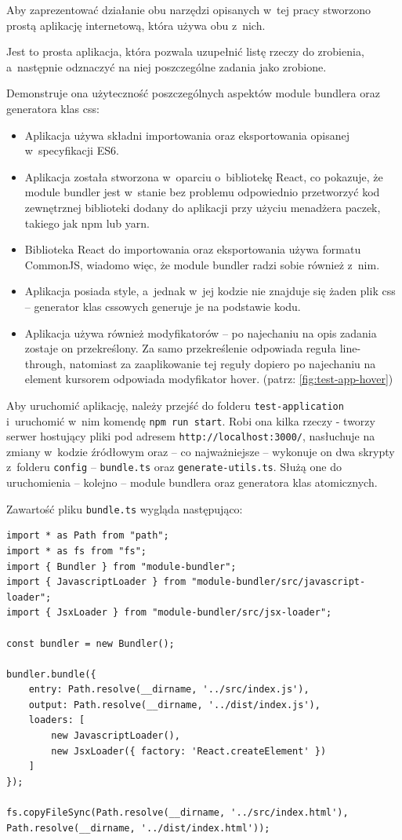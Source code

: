 \documentclass{SGGW-thesis}
\begin{document}
Aby zaprezentować działanie obu narzędzi opisanych w~tej pracy stworzono prostą aplikację internetową, która używa obu z~nich.

Jest to prosta aplikacja, która pozwala uzupełnić listę rzeczy do zrobienia, a~następnie odznaczyć na niej poszczególne zadania jako zrobione.

Demonstruje ona użyteczność poszczególnych aspektów module bundlera oraz generatora klas css:
\begin{itemize}
    \item Aplikacja używa składni importowania oraz eksportowania opisanej w~specyfikacji ES6.
    \item Aplikacja została stworzona w~oparciu o~bibliotekę React, co pokazuje, że module bundler jest w~stanie bez problemu odpowiednio przetworzyć kod zewnętrznej biblioteki dodany do aplikacji przy użyciu menadżera paczek, takiego jak npm lub yarn.
    \item Biblioteka React do importowania oraz eksportowania używa formatu CommonJS, wiadomo więc, że module bundler radzi sobie również z~nim.
    \item Aplikacja posiada style, a~jednak w~jej kodzie nie znajduje się żaden plik css -- generator klas cssowych generuje je na podstawie kodu.
    \item Aplikacja używa również modyfikatorów -- po najechaniu na opis zadania zostaje on przekreślony. Za samo przekreślenie odpowiada reguła line-through, natomiast za zaaplikowanie tej reguły dopiero po najechaniu na element kursorem odpowiada modyfikator hover. (patrz: \ref{fig:test-app-hover})
\end{itemize}

Aby uruchomić aplikację, należy przejść do folderu \verb|test-application| i~uruchomić w~nim komendę \verb|npm run start|. Robi ona kilka rzeczy - tworzy serwer hostujący pliki pod adresem \verb|http://localhost:3000/|, nasłuchuje na zmiany w~kodzie źródłowym oraz -- co najważniejsze -- wykonuje on dwa skrypty z~folderu \verb|config| -- \verb|bundle.ts| oraz \verb|generate-utils.ts|. Służą one do uruchomienia -- kolejno -- module bundlera oraz generatora klas atomicznych.

Zawartość pliku \verb|bundle.ts| wygląda następująco:

\begin{verbatim}
import * as Path from "path";
import * as fs from "fs";
import { Bundler } from "module-bundler";
import { JavascriptLoader } from "module-bundler/src/javascript-loader";
import { JsxLoader } from "module-bundler/src/jsx-loader";

const bundler = new Bundler();

bundler.bundle({
	entry: Path.resolve(__dirname, '../src/index.js'),
	output: Path.resolve(__dirname, '../dist/index.js'),
	loaders: [
		new JavascriptLoader(),
		new JsxLoader({ factory: 'React.createElement' })
	]
});

fs.copyFileSync(Path.resolve(__dirname, '../src/index.html'), Path.resolve(__dirname, '../dist/index.html'));
\end{verbatim}
\end{document}
